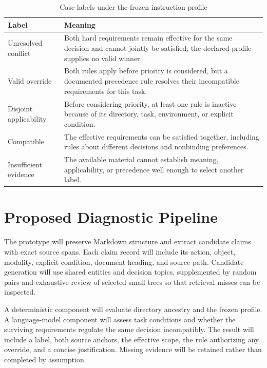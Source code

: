 \documentclass[10pt,conference]{IEEEtran}
\begin{document}
\begin{table}[t]
\caption{Case labels under the frozen instruction profile}
\label{tab:labels}
\centering
\small
\begin{tabular}{>{\raggedright\arraybackslash}p{}>{\raggedright\arraybackslash}p{}}
\hline
\textbf{Label} & \textbf{Meaning}\\\hline
Unresolved conflict & Both hard requirements remain effective for the same decision and cannot jointly be satisfied; the declared profile supplies no valid winner.\\[3pt]
Valid override & Both rules apply before priority is considered, but a documented precedence rule resolves their incompatible requirements for this task.\\[3pt]
Disjoint applicability & Before considering priority, at least one rule is inactive because of its directory, task, environment, or explicit condition.\\[3pt]
Compatible & The effective requirements can be satisfied together, including rules about different decisions and nonbinding preferences.\\[3pt]
Insufficient evidence & The available material cannot establish meaning, applicability, or precedence well enough to select another label.\\[3pt]
\hline
\end{tabular}
\end{table}

\section{Proposed Diagnostic Pipeline}

The prototype will preserve Markdown structure and extract candidate claims with exact source spans. Each claim record will include its action, object, modality, explicit condition, document heading, and source path. Candidate generation will use shared entities and decision topics, supplemented by random pairs and exhaustive review of selected small trees so that retrieval misses can be inspected.


A deterministic component will evaluate directory ancestry and the frozen profile. A language-model component will assess task conditions and whether the surviving requirements regulate the same decision incompatibly. The result will include a label, both source anchors, the effective scope, the rule authorizing any override, and a concise justification. Missing evidence will be retained rather than completed by assumption.
\end{document}

